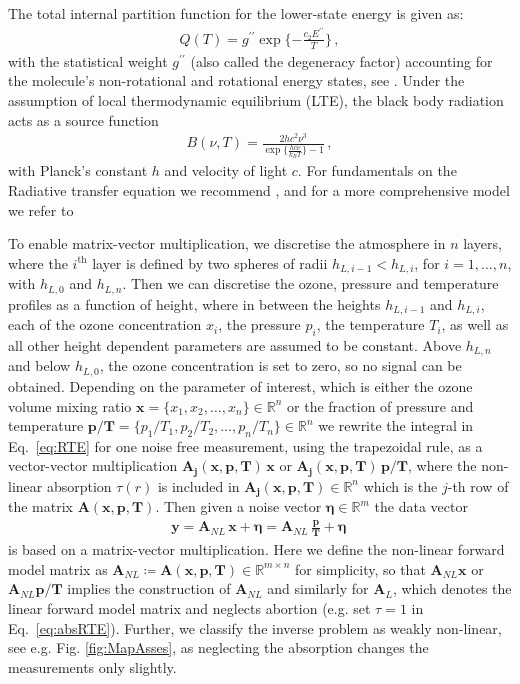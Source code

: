 The total internal partition function for the lower-state energy is given as:
\begin{align}
	Q(T )= g^{\prime \prime} \exp{\{ - \frac{ c_2 E^{\prime \prime} }{T}\}} \, ,
\end{align}
with the statistical weight $ g^{\prime \prime}$ (also called the degeneracy factor) accounting for the molecule's non-rotational and rotational energy states, see \cite{vsimevckova2006einstein}.
Under the assumption of local thermodynamic equilibrium (LTE), the black body radiation acts as a source function
\begin{align}
	B(\nu,T)   = \frac{2 h c^2 \nu^3}{\exp{\{\frac{hc\nu}{k_B T}\}}-1}\, ,
\end{align}
with Planck's constant $h$ and velocity of light $c$.
For fundamentals on the Radiative transfer equation we recommend \cite[Chapter 1]{rybicki2000rte}, and for a more comprehensive model we refer to \cite{read2006forwardModel}

To enable matrix-vector multiplication, we discretise the atmosphere in $n$ layers, where the $i^\text{th}$ layer is defined by two spheres of radii $h_{L,i-1} < h_{L,i}$, for $i = 1, \dots, n$, with $h_{L,0}$ and $h_{L,n} $.
Then we can discretise the ozone, pressure and temperature profiles as a function of height, where in between the heights $h_{L,i-1}$ and $h_{L,i}$, each of the ozone concentration $x_{i}$, the pressure $p_{i}$, the temperature $T_{i}$, as well as all other height dependent parameters are assumed to be constant.
Above $h_{L, n}$ and below $h_{L,0} $, the ozone concentration is set to zero, so no signal can be obtained.
Depending on the parameter of interest, which is either the ozone volume mixing ratio $\bm{x} =\{x_1,x_2,\ldots,x_n\} \in \mathbb{R}^{n}$ or the fraction of pressure and temperature $\bm{p/T}= \{p_1/T_1,p_2/T_2,\ldots,p_n/T_n\} \in \mathbb{R}^{n} $
we rewrite the integral in Eq.~\eqref{eq:RTE} for one noise free measurement, using the trapezoidal rule, as a vector-vector multiplication $\bm{A_{j}}(\bm{x},  \bm{p},\bm{T}) \, \bm{x} $ or $\bm{A_{j}}(\bm{x},  \bm{p},\bm{T}) \, \bm{p}/ \bm{T} $, where the non-linear absorption $\tau(r)$ is included in $\bm{A_{j}}(\bm{x},  \bm{p},\bm{T}) \in \mathbb{R}^{n}$ which is the $j$-th row of the matrix $\bm{A}(\bm{x},  \bm{p},\bm{T})$.
Then given a noise vector $\bm{\eta} \in \mathbb{R}^{m}$ the data vector
\begin{align}
	\bm{y} = \bm{A}_{NL} \, \bm{x} + \bm{\eta}= \bm{A}_{NL} \,
	\frac{ \bm{p}}{\bm{T}} + \bm{\eta} \, 
\end{align}
is based on a matrix-vector multiplication.
Here we define the non-linear forward model matrix as $\bm{A}_{NL} \coloneqq \bm{A}(\bm{x},  \bm{p},\bm{T})   \in \mathbb{R}^{m \times n}$ for simplicity, so that $\bm{A}_{NL}\bm{x}$ or $\bm{A}_{NL}\bm{p}/\bm{T}$ implies the construction of $\bm{A}_{NL}$ and similarly for $\bm{A}_L$, which denotes the linear forward model matrix and neglects abortion (e.g. set $\tau = 1$ in Eq.~\eqref{eq:absRTE}).
Further, we classify the inverse problem as weakly non-linear, see e.g. Fig. \ref{fig:MapAsses}, as neglecting the absorption changes the measurements only slightly.



